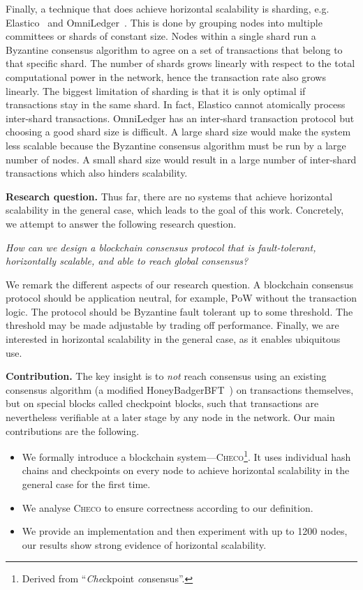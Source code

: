 Finally, a technique that does achieve horizontal scalability is sharding, e.g. Elastico~\cite{luu2016elastico} and OmniLedger~\cite{kokoris2017omniledger}.
This is done by grouping nodes into multiple committees or shards of constant size.
Nodes within a single shard run a Byzantine consensus algorithm to agree on a set of transactions that belong to that specific shard.
The number of shards grows linearly with respect to the total computational power in the network, hence the transaction rate also grows linearly.
The biggest limitation of sharding is that it is only optimal if transactions stay in the same shard.
In fact, Elastico cannot atomically process inter-shard transactions.
OmniLedger has an inter-shard transaction protocol but choosing a good shard size is difficult.
A large shard size would make the system less scalable because the Byzantine consensus algorithm must be run by a large number of nodes.
A small shard size would result in a large number of inter-shard transactions which also hinders scalability.

\textbf{Research question.\quad}
Thus far, there are no systems that achieve horizontal scalability in the general case,
which leads to the goal of this work.
Concretely, we attempt to answer the following research question.
\begin{displayquote}
    \emph{How can we design a blockchain consensus protocol that is fault-tolerant,
    horizontally scalable,
    and able to reach global consensus?}
    \end{displayquote}
We remark the different aspects of our research question.
A blockchain consensus protocol should be application neutral,
for example, PoW without the transaction logic.
The protocol should be Byzantine fault tolerant up to some threshold.
The threshold may be made adjustable by trading off performance.
Finally, we are interested in horizontal scalability in the general case, as it enables ubiquitous use.

\textbf{Contribution.\quad}
The key insight is to \emph{not} reach consensus using an existing consensus algorithm (a modified HoneyBadgerBFT~\cite{miller2016honey}) on transactions themselves,
but on special blocks called checkpoint blocks,
such that transactions are nevertheless verifiable at a later stage by any node in the network.
Our main contributions are the following.
\begin{itemize}
    \item We formally introduce a blockchain system---\textsc{Checo}\footnote{Derived from ``\emph{Che}ckpoint \emph{co}nsensus''.}.
        It uses individual hash chains and checkpoints on every node to achieve
        horizontal scalability in the general case for the first time.
    \item We analyse \textsc{Checo} to ensure correctness according to our definition.
    \item We provide an implementation and then experiment with up to 1200 nodes,
        our results show strong evidence of horizontal scalability.
\end{itemize}

